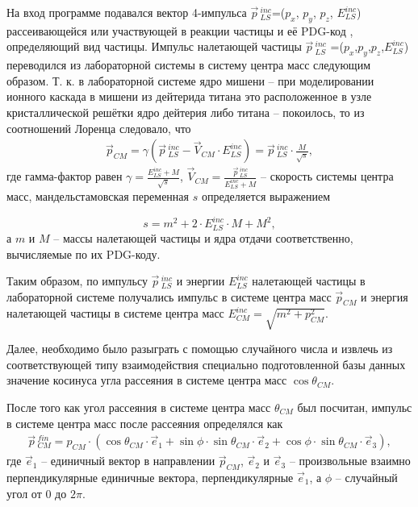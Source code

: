 \documentclass[a4paper,12pt]{article}
\begin{document}
\begin{large}
	На вход программе подавался вектор 4-импульса $\vec{p}\,^{inc}_{LS}$=($p_x$, $p_y$, $p_z$, $E^{inc}_{LS}$) рассеивающейся или участвующей в реакции частицы и её PDG-код \cite{PDG}, определяющий вид частицы.
	Импульс налетающей частицы $\vec{p}\,_{LS}^{inc}$ =($p_x$,$p_y$,$p_z$,$E^{inc}_{LS}$) переводился из лабораторной системы в систему центра масс следующим образом.
	Т. к. в лабораторной системе ядро мишени -- при моделировании ионного каскада в мишени из дейтерида титана это расположенное в узле кристаллической решётки ядро дейтерия либо титана -- покоилось, то из соотношений Лоренца следовало, что
\begin{equation}
\label{PLStoCM}
\begin{aligned} 
  \vec{p}_{CM} = \gamma \left( \vec{p}\,_{LS}^{inc} - \vec{V}_{CM} \cdot E_{LS}^{inc} \right) = \vec{p}\,_{LS}^{inc} \cdot \frac{M}{\sqrt{s}},
\end{aligned}
\end{equation}
где гамма-фактор равен $\gamma=\frac{E_{LS}^{inc}+M}{\sqrt{s}}$, $\vec{V}_{CM} = \frac{\vec{p}\,_{LS}^{inc}}{E_{LS}^{inc}+M}$ -- скорость системы центра масс, мандельстамовская переменная $s$ определяется выражением

\begin{equation}
  \label{MandelStahmSVariableDefinition}    
  s=m^2+2 \cdot E^{inc}_{LS} \cdot M + M^2,
\end{equation}
	а $m$ и $M$ -- массы налетающей частицы и ядра отдачи соответственно, вычисляемые по их PDG-коду. 

	Таким образом, по импульсу $\vec{p}\,_{LS}^{inc}$ и энергии $E_{LS}^{inc}$ налетающей частицы в лабораторной системе получались импульс в системе центра масс $\vec{p}_{CM}$ и энергия налетающей частицы в системе центра масс $E^{inc}_{CM}=\sqrt{m^2+p_{CM}^2}$.
	
	Далее, необходимо было разыграть с помощью случайного числа и извлечь из соответствующей типу взаимодействия специально подготовленной базы данных значение косинуса угла рассеяния в системе центра масс $\cos{\theta_{CM}}$.
	
	После того как угол рассеяния в системе центра масс $\theta_{CM}$ был посчитан, импульс в системе центра масс после рассеяния определялся как
\begin{equation}
\label{CMMomentumFin}
\begin{aligned} 
  {\vec{p}}\,_{CM}^{fin} = p_{CM}\cdot\left(\cos{\theta_{CM}} \cdot \vec{e}_1 + \sin{\phi} \cdot   \sin{\theta_{CM}} \cdot \vec{e}_2 +  \cos{\phi} \cdot \sin{\theta_{CM}} \cdot \vec{e}_3\right),
\end{aligned}
\end{equation}
где $\vec{e}_1$ -- единичный вектор в направлении $\vec{p}_{CM}$, $\vec{e}_2$ и $\vec{e}_3$ -- произвольные взаимно перпендикулярные единичные вектора, перпендикулярные $\vec{e}_1$, а $\phi$ -- случайный угол от $0$ до $2\pi$.
	

\end{large}
\end{document}
